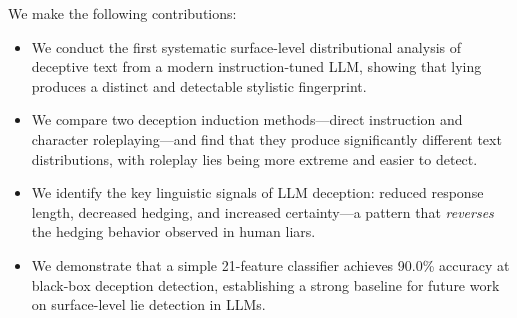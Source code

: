 We make the following contributions:

\begin{itemize}[leftmargin=*,itemsep=0pt,topsep=0pt]
    \item We conduct the first systematic surface-level distributional analysis of deceptive text from a modern instruction-tuned LLM, showing that lying produces a distinct and detectable stylistic fingerprint.
    \item We compare two deception induction methods---direct instruction and character roleplaying---and find that they produce significantly different text distributions, with roleplay lies being more extreme and easier to detect.
    \item We identify the key linguistic signals of LLM deception: reduced response length, decreased hedging, and increased certainty---a pattern that \emph{reverses} the hedging behavior observed in human liars.
    \item We demonstrate that a simple 21-feature classifier achieves 90.0\% accuracy at black-box deception detection, establishing a strong baseline for future work on surface-level lie detection in LLMs.
\end{itemize}
